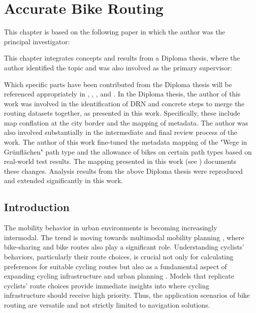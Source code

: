 \chapter{Accurate Bike Routing}\label{ch:routing}

\begin{Summary}
This chapter is based on the following paper in which the author was the principal investigator:

\cite{matthes2023accurate} 

This chapter integrates concepts and results from a Diploma thesis, where the author identified the topic and was also involved as the primary supervisor:

\cite{lorenz_2022} 

Which specific parts have been contributed from the Diploma thesis will be referenced appropriately in , , , and . In the Diploma thesis, the author of this work was involved in the identification of DRN and concrete steps to merge the routing datasets together, as presented in this work. Specifically, these include map conflation at the city border and the mapping of metadata. The author was also involved substantially in the intermediate and final review process of the work. The author of this work fine-tuned the metadata mapping of the "Wege in Grünflächen" path type and the allowance of bikes on certain path types based on real-world test results. The mapping presented in this work (see ) documents these changes. Analysis results from the above Diploma thesis were reproduced and extended significantly in this work.
\end{Summary}

\section{Introduction}

The mobility behavior in urban environments is becoming increasingly intermodal. The trend is moving towards multimodal mobility planning \cite{park_framework_2023}, where bike-sharing and bike routes also play a significant role. Understanding cyclists' behaviors, particularly their route choices, is crucial not only for calculating preferences for suitable cycling routes but also as a fundamental aspect of expanding cycling infrastructure and urban planning \cite{zielstra_comparative_2011, huber_modelling_2021}. Models that replicate cyclists' route choices provide immediate insights into where cycling infrastructure should receive high priority. Thus, the application scenarios of bike routing are versatile and not strictly limited to navigation solutions.

